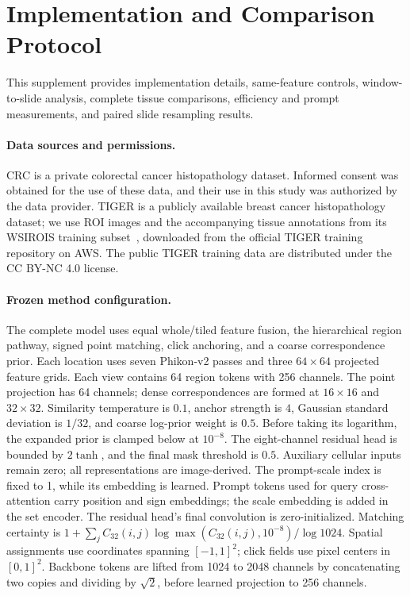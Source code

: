 \section{Implementation and Comparison Protocol}
This supplement provides implementation details, same-feature controls, window-to-slide analysis, complete tissue comparisons, efficiency and prompt measurements, and paired slide resampling results.

\paragraph{Data sources and permissions.}
CRC is a private colorectal cancer histopathology dataset. Informed consent was obtained for the use of these data, and their use in this study was authorized by the data provider. TIGER is a publicly available breast cancer histopathology dataset; we use ROI images and the accompanying tissue annotations from its WSIROIS training subset~\cite{vanrijthoven2022tiger}, downloaded from the official TIGER training repository on AWS. The public TIGER training data are distributed under the CC BY-NC 4.0 license.

\paragraph{Frozen method configuration.}
The complete model uses equal whole/tiled feature fusion, the hierarchical region pathway, signed point matching, click anchoring, and a coarse correspondence prior. Each location uses seven Phikon-v2 passes and three $64\times64$ projected feature grids. Each view contains 64 region tokens with 256 channels. The point projection has 64 channels; dense correspondences are formed at $16\times16$ and $32\times32$. Similarity temperature is $0.1$, anchor strength is $4$, Gaussian standard deviation is $1/32$, and coarse log-prior weight is $0.5$. Before taking its logarithm, the expanded prior is clamped below at $10^{-8}$. The eight-channel residual head is bounded by $2\tanh$, and the final mask threshold is $0.5$. Auxiliary cellular inputs remain zero; all representations are image-derived. The prompt-scale index is fixed to 1, while its embedding is learned. Prompt tokens used for query cross-attention carry position and sign embeddings; the scale embedding is added in the set encoder. The residual head's final convolution is zero-initialized. Matching certainty is $1+\sum_j C_{32}(i,j)\log\max(C_{32}(i,j),10^{-8})/\log 1024$. Spatial assignments use coordinates spanning $[-1,1]^2$; click fields use pixel centers in $[0,1]^2$. Backbone tokens are lifted from 1024 to 2048 channels by concatenating two copies and dividing by $\sqrt{2}$, before learned projection to 256 channels.

